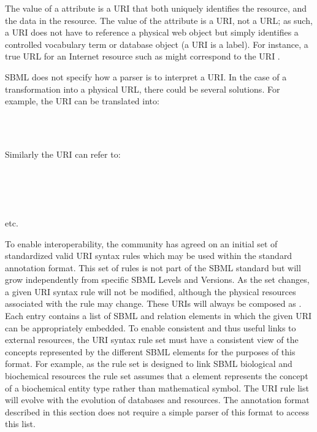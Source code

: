 The value of a  attribute is a URI that both
uniquely identifies the resource, and the data in the resource. 
The value of the  attribute is a URI, not a
URL; as such, a URI does not have to reference a physical web
object but simply identifies a controlled vocabulary term or
database object (a URI is a label). For instance, a true URL for an Internet
resource such as  might
correspond to the URI .

SBML does not specify how a parser is to interpret a URI. In the
case of a transformation into a physical URL, there could be
several solutions. For example, the URI
 can be translated
into:

\noindent {}\\
\noindent {}\\
\noindent {}

Similarly the URI  can refer to:

\noindent {}\\
\noindent {}\\
\noindent {}\\
\noindent {}\\[1ex]
\noindent etc.

To enable interoperability, the community has agreed on an initial
set of standardized valid URI syntax rules which may be used
within the standard annotation format. This set of rules is not
part of the SBML standard but will grow independently from
specific SBML Levels and Versions. As the set changes, a given URI
syntax rule will not be modified, although the physical resources
associated with the rule may change. These URIs will always be
composed as . 
Each entry contains a list of SBML and relation elements in which
the given URI can be appropriately embedded. To enable consistent
and thus useful links to external resources, the URI syntax rule
set must have a consistent view of the concepts represented by the
different SBML elements for the purposes of this format.  For
example, as the rule set is designed to link SBML biological and
biochemical resources the rule set assumes that a \Species element
represents the concept of a biochemical entity type rather than
mathematical symbol. The URI rule list will evolve with the
evolution of databases and resources. The annotation format
described in this section does not require a simple parser of this
format to access this list.


